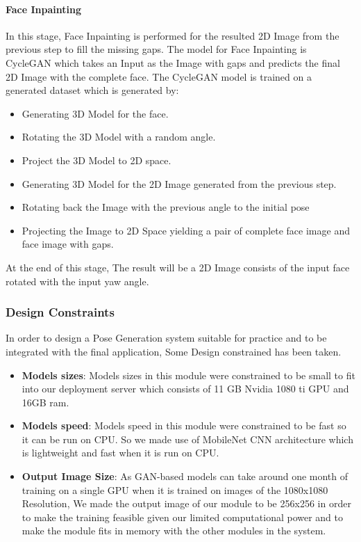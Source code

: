 \paragraph{Face Inpainting}
In this stage, Face Inpainting is performed for the resulted 2D Image from the previous step to fill the missing gaps. The model for Face Inpainting is CycleGAN which takes an Input as the Image with gaps and predicts the final 2D Image with the complete face. The CycleGAN model is trained on a generated dataset which is generated by: 
\begin{itemize}
    \item Generating 3D Model for the face.
    \item Rotating the 3D Model with a random angle.
    \item Project the 3D Model to 2D space.
    \item Generating 3D Model for the 2D Image generated from the previous step.
    \item Rotating back the Image with the previous angle to the initial pose
    \item Projecting the Image to 2D Space yielding a pair of complete face image and face image with gaps.
\end{itemize}

At the end of this stage, The result will be a 2D Image consists of the input face rotated with the input yaw angle.

\subsubsection{Design Constraints}
In order to design a Pose Generation system suitable for practice and to be integrated with the final application, Some Design constrained has been taken.

\begin{itemize}
    \item \textbf{Models sizes}: Models sizes in this module were constrained to be small to fit into our deployment server which consists of 11 GB Nvidia 1080 ti GPU and 16GB ram.
    
    \item \textbf{Models speed}: Models speed in this module were constrained to be fast so it can be run on CPU. So we made use of MobileNet CNN architecture which is lightweight and fast when it is run on CPU.
    
    \item \textbf{Output Image Size}: As GAN-based models can take around one month of training on a single GPU when it is trained on images of the 1080x1080 Resolution, We made the output image of our module to be 256x256 in order to make the training feasible given our limited computational power and to make the module fits in memory with the other modules in the system. 
    
\end{itemize}
